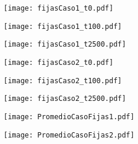 \documentclass[12pt,letterpaper]{article}
\begin{document}
\begin{figure}[h]
\texttt{[image: fijasCaso1\_t0.pdf]}
\centering
\end{figure}

\begin{figure}[h]
\texttt{[image: fijasCaso1\_t100.pdf]}
\centering
\end{figure}

\begin{figure}[h]
\texttt{[image: fijasCaso1\_t2500.pdf]}
\centering
\end{figure}

\begin{figure}[h]
\texttt{[image: fijasCaso2\_t0.pdf]}
\centering
\end{figure}

\begin{figure}[h]
\texttt{[image: fijasCaso2\_t100.pdf]}
\centering
\end{figure}

\begin{figure}[h]
\texttt{[image: fijasCaso2\_t2500.pdf]}
\centering
\end{figure}

\begin{figure}[h]
\texttt{[image: PromedioCasoFijas1.pdf]}
\centering
\end{figure}

\begin{figure}[h]
\texttt{[image: PromedioCasoFijas2.pdf]}
\centering
\end{figure}
\end{document}
